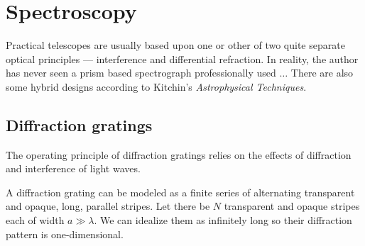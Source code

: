 %
\chapter{Spectroscopy}

Practical telescopes are usually based upon one or other of two quite separate optical
principles --- interference and differential refraction. In reality, the author has never
seen a prism based spectrograph professionally used $\ldots$ There are also some 
hybrid designs according to Kitchin's {\it Astrophysical Techniques}. 

\section{Diffraction gratings}

The operating principle of diffraction gratings relies on the effects of diffraction 
and interference of light waves. 

A diffraction grating can be modeled as a finite series of alternating transparent 
and opaque, long, parallel stripes. Let there be $N$ transparent and opaque stripes 
each of width $a\gg\lambda$. We can idealize them as infinitely long so their diffraction
pattern is one-dimensional.

